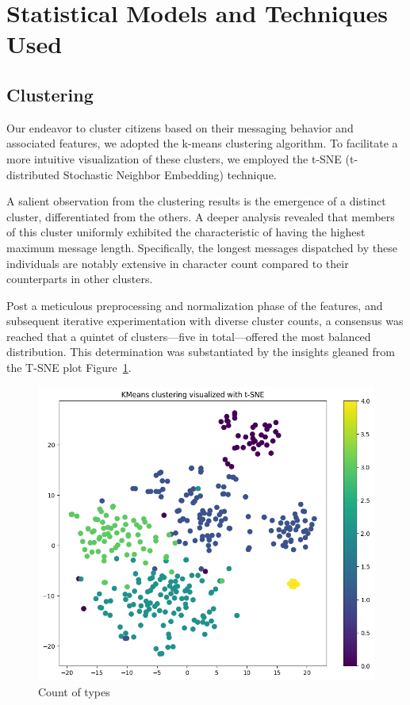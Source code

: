 \documentclass[12pt]{article}
\begin{document}
\section{Statistical Models and Techniques Used}

\label{s.stats}

\subsection{Clustering}

Our endeavor to cluster citizens based on their messaging behavior and associated features, we adopted the k-means clustering algorithm. To facilitate a more intuitive visualization of these clusters, we employed the t-SNE (t-distributed Stochastic Neighbor Embedding) technique. 

A salient observation from the clustering results is the emergence of a distinct cluster, differentiated from the others. A deeper analysis revealed that members of this cluster uniformly exhibited the characteristic of having the highest maximum message length. Specifically, the longest messages dispatched by these individuals are notably extensive in character count compared to their counterparts in other clusters.

Post a meticulous preprocessing and normalization phase of the features, and subsequent iterative experimentation with diverse cluster counts, a consensus was reached that a quintet of clusters—five in total—offered the most balanced distribution. This determination was substantiated by the insights gleaned 
from the T-SNE plot Figure~\ref{fig:cluster}.

\begin{figure}[h]
  \centering
  \includegraphics[width=0.6\linewidth]{images/Kmeans_5_clusters}
  \caption{Count of types}
  \label{fig:cluster}
  \end{figure}
\end{document}
